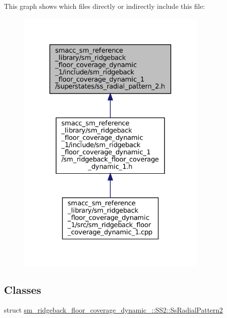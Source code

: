 This graph shows which files directly or indirectly include this file\+:
\nopagebreak
\begin{figure}[H]
\begin{center}
\leavevmode
\includegraphics[width=264pt]{sm__ridgeback__floor__coverage__dynamic__1_2include_2sm__ridgeback__floor__coverage__dynamic__1_ce008012ea72be3361f7fa395d034922}
\end{center}
\end{figure}
\subsection*{Classes}
\begin{DoxyCompactItemize}
\item 
struct \hyperlink{structsm__ridgeback__floor__coverage__dynamic__1_1_1SS2_1_1SsRadialPattern2}{sm\+\_\+ridgeback\+\_\+floor\+\_\+coverage\+\_\+dynamic\+\_\+::\+S\+S2\+::\+Ss\+Radial\+Pattern2}
\end{DoxyCompactItemize}
